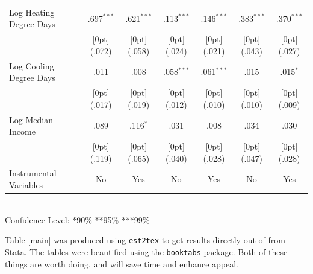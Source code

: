 \documentclass[10pt]{article}
\begin{document}
\begin{table}[h!]
\begin{tabular*}{\textwidth}{@{\extracolsep{\fill}}lcccccc}
Log Heating Degree Days &	.697$^{***}$ &	.621$^{***}$ &	.113$^{***}$ &	.146$^{***}$ &	.383$^{***}$ &	.370$^{***}$ \\
&	\raisebox{.7ex}[0pt]{\scriptsize (.072)} &	\raisebox{.7ex}[0pt]{\scriptsize (.058)} &	\raisebox{.7ex}[0pt]{\scriptsize (.024)} &	\raisebox{.7ex}[0pt]{\scriptsize (.021)} &	\raisebox{.7ex}[0pt]{\scriptsize (.043)} &	\raisebox{.7ex}[0pt]{\scriptsize (.027)} \\
Log Cooling Degree Days &	.011 &	.008 &	.058$^{***}$ &	.061$^{***}$ &	.015 &	.015$^{*}$ \\
&	\raisebox{.7ex}[0pt]{\scriptsize (.017)} &	\raisebox{.7ex}[0pt]{\scriptsize (.019)} &	\raisebox{.7ex}[0pt]{\scriptsize (.012)} &	\raisebox{.7ex}[0pt]{\scriptsize (.010)} &	\raisebox{.7ex}[0pt]{\scriptsize (.010)} &	\raisebox{.7ex}[0pt]{\scriptsize (.009)} \\
Log Median Income &	.089 &	.116$^{*}$ &	.031 &	.008 &	.034 &	.030 \\
&	\raisebox{.7ex}[0pt]{\scriptsize (.119)} &	\raisebox{.7ex}[0pt]{\scriptsize (.065)} &	\raisebox{.7ex}[0pt]{\scriptsize (.040)} &	\raisebox{.7ex}[0pt]{\scriptsize (.028)} &	\raisebox{.7ex}[0pt]{\scriptsize (.047)} &	\raisebox{.7ex}[0pt]{\scriptsize (.028)} \\
\midrule
Instrumental Variables & No & Yes &No&Yes&No&Yes\\
\bottomrule		
\end{tabular*}%
\\Confidence Level: *90\% **95\% ***99\%	
\end{table}
Table \ref{main} was produced using \texttt{est2tex} to get results directly out of from Stata.  The tables were beautified using the \texttt{booktabs} package.  Both of these things are worth doing, and will save time and enhance appeal.
\end{document}
